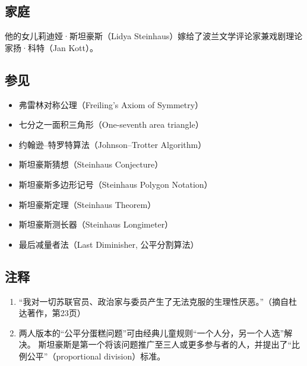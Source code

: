 \subsection{家庭}
他的女儿莉迪娅·斯坦豪斯（Lidya Steinhaus）嫁给了波兰文学评论家兼戏剧理论家扬·科特（Jan Kott）。
\subsection{参见}
\begin{itemize}
  \item 弗雷林对称公理（Freiling's Axiom of Symmetry）
  \item 七分之一面积三角形（One-seventh area triangle）
  \item 约翰逊–特罗特算法（Johnson–Trotter Algorithm）
  \item 斯坦豪斯猜想（Steinhaus Conjecture）
  \item 斯坦豪斯多边形记号（Steinhaus Polygon Notation）
  \item 斯坦豪斯定理（Steinhaus Theorem）
  \item 斯坦豪斯测长器（Steinhaus Longimeter）
  \item 最后减量者法（Last Diminisher, 公平分割算法）
\end{itemize}
\subsection{注释}
\begin{enumerate}[label=\Alph*.]
  \item “我对一切苏联官员、政治家与委员产生了无法克服的生理性厌恶。”（摘自杜达著作，第23页）
  \item 两人版本的“公平分蛋糕问题”可由经典儿童规则“一个人分，另一个人选”解决。  
  斯坦豪斯是第一个将该问题推广至三人或更多参与者的人，并提出了“比例公平”（proportional division）标准。
\end{enumerate}
